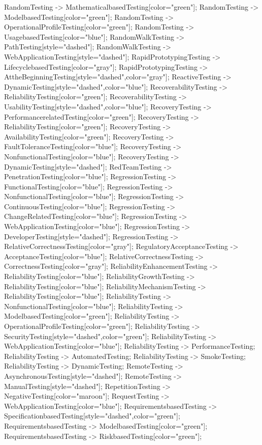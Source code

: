 \documentclass{article}
\begin{document}
{RandomTesting -> MathematicalbasedTesting[color="green"];
RandomTesting -> ModelbasedTesting[color="green"];
RandomTesting -> OperationalProfileTesting[color="green"];
RandomTesting -> UsagebasedTesting[color="blue"];
RandomWalkTesting -> PathTesting[style="dashed"];
RandomWalkTesting -> WebApplicationTesting[style="dashed"];
RapidPrototypingTesting -> LifecyclebasedTesting[color="gray"];
RapidPrototypingTesting -> AttheBeginningTesting[style="dashed",color="gray"];
ReactiveTesting -> DynamicTesting[style="dashed",color="blue"];
RecoverabilityTesting -> ReliabilityTesting[color="green"];
RecoverabilityTesting -> UsabilityTesting[style="dashed",color="blue"];
RecoveryTesting -> PerformancerelatedTesting[color="green"];
RecoveryTesting -> ReliabilityTesting[color="green"];
RecoveryTesting -> AvailabilityTesting[color="green"];
RecoveryTesting -> FaultToleranceTesting[color="blue"];
RecoveryTesting -> NonfunctionalTesting[color="blue"];
RecoveryTesting -> DynamicTesting[style="dashed"];
RedTeamTesting -> PenetrationTesting[color="blue"];
RegressionTesting -> FunctionalTesting[color="blue"];
RegressionTesting -> NonfunctionalTesting[color="blue"];
RegressionTesting -> ContinuousTesting[color="blue"];
RegressionTesting -> ChangeRelatedTesting[color="blue"];
RegressionTesting -> WebApplicationTesting[color="blue"];
RegressionTesting -> DeveloperTesting[style="dashed"];
RegressionTesting -> RelativeCorrectnessTesting[color="gray"];
RegulatoryAcceptanceTesting -> AcceptanceTesting[color="blue"];
RelativeCorrectnessTesting -> CorrectnessTesting[color="gray"];
ReliabilityEnhancementTesting -> ReliabilityTesting[color="blue"];
ReliabilityGrowthTesting -> ReliabilityTesting[color="blue"];
ReliabilityMechanismTesting -> ReliabilityTesting[color="blue"];
ReliabilityTesting -> NonfunctionalTesting[color="blue"];
ReliabilityTesting -> ModelbasedTesting[color="green"];
ReliabilityTesting -> OperationalProfileTesting[color="green"];
ReliabilityTesting -> SecurityTesting[style="dashed",color="green"];
ReliabilityTesting -> WebApplicationTesting[color="blue"];
ReliabilityTesting -> PerformanceTesting;
ReliabilityTesting -> AutomatedTesting;
ReliabilityTesting -> SmokeTesting;
ReliabilityTesting -> DynamicTesting;
RemoteTesting -> AsynchronousTesting[style="dashed"];
RemoteTesting -> ManualTesting[style="dashed"];
RepetitionTesting -> NegativeTesting[color="maroon"];
RequestTesting -> WebApplicationTesting[color="blue"];
RequirementsbasedTesting -> SpecificationbasedTesting[style="dashed",color="green"];
RequirementsbasedTesting -> ModelbasedTesting[color="green"];
RequirementsbasedTesting -> RiskbasedTesting[color="green"];
}
\end{document}

